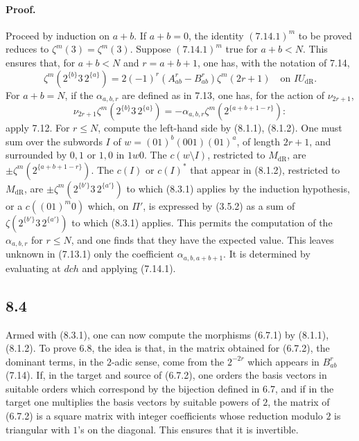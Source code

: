 \documentclass[11pt]{article}
\newcommand{\dR}{\mathrm{dR}}
\begin{document}
\paragraph{Proof.}
Proceed by induction on $a+b$.
If $a+b=0$, the identity $(7.14.1)^m$ to be proved reduces to $\zeta^m(3)=\zeta^m(3)$.
Suppose $(7.14.1)^m$ true for $a+b<N$.
This ensures that, for $a+b<N$ and $r=a+b+1$, one has, with the notation of 7.14,
\begin{equation}
 \zeta^m(2^{\{b\}}3\,2^{\{a\}})=2(-1)^r(A^r_{ab}-B^r_{ab})\zeta^m(2r+1)\quad\text{on }IU_{\dR}.
\tag{8.3.1}
\end{equation}
For $a+b=N$, if the $\alpha_{a,b,r}$ are defined as in 7.13, one has, for the action of $\nu_{2r+1}$,
\begin{equation}
 \nu_{2r+1}\zeta^m(2^{\{b\}}3\,2^{\{a\}})
 =-\alpha_{a,b,r}\zeta^m(2^{\{a+b+1-r\}}):
\tag{8.3.2}
\end{equation}
apply 7.12.
For $r\leq N$, compute the left-hand side by (8.1.1), (8.1.2).
One must sum over the subwords $I$ of $w=(01)^b(001)(01)^a$, of length $2r+1$, and surrounded by $0,1$ or $1,0$ in $1w0$.
The $c(w\setminus I)$, restricted to $M_{\dR}$, are $\pm\zeta^m(2^{\{a+b+1-r\}})$.
The $c(I)$ or $c(I)^*$ that appear in (8.1.2), restricted to $M_{\dR}$, are $\pm\zeta^m(2^{\{b'\}}3\,2^{\{a'\}})$ to which (8.3.1) applies by the induction hypothesis, or a $c((01)^m0)$ which, on $\Pi'$, is expressed by (3.5.2) as a sum of $\zeta(2^{\{b'\}}3\,2^{\{a'\}})$ to which (8.3.1) applies.
This permits the computation of the $\alpha_{a,b,r}$ for $r\leq N$, and one finds that they have the expected value.
This leaves unknown in (7.13.1) only the coefficient $\alpha_{a,b,a+b+1}$.
It is determined by evaluating at $dch$ and applying (7.14.1).

\subsection*{8.4}
Armed with (8.3.1), one can now compute the morphisms (6.7.1) by (8.1.1), (8.1.2).
To prove 6.8, the idea is that, in the matrix obtained for (6.7.2), the dominant terms, in the $2$-adic sense, come from the $2^{-2r}$ which appears in $B^r_{ab}$ (7.14).
If, in the target and source of (6.7.2), one orders the basis vectors in suitable orders which correspond by the bijection defined in 6.7, and if in the target one multiplies the basis vectors by suitable powers of $2$, the matrix of (6.7.2) is a square matrix with integer coefficients whose reduction modulo $2$ is triangular with $1$'s on the diagonal.
This ensures that it is invertible.
\end{document}
